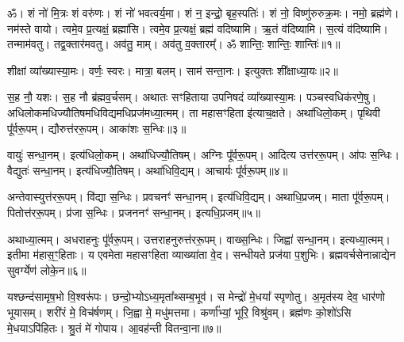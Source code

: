 \setcounter{anuvakam}{0}
\label{sec:start_taittiriyopanishat}

ॐ। शं नो॑ मि॒त्रः शं वरु॑णः। 
शं नो॑ भवत्वर्य॒मा। 
शं न॒ इन्द्रो॒ बृह॒स्पतिः॑। 
शं नो॒ विष्णु॑रुरुक्र॒मः। 
नमो॒ ब्रह्म॑णे। 
नम॑स्ते वायो। 
त्वमे॒व प्र॒त्यक्षं॒ ब्रह्मा॑सि। 
त्वमे॒व प्र॒त्यक्षं॒ ब्रह्म॑ वदिष्यामि। 
ऋ॒तं व॑दिष्यामि। 
स॒त्यं व॑दिष्यामि। 
तन्माम॑वतु। 
तद्व॒क्तार॑मवतु। 
अव॑तु॒ माम्। 
अव॑तु व॒क्तारम्᳚। 
ॐ शान्तिः॒ शान्तिः॒ शान्तिः॑॥१॥%
\anuvakamend[स॒त्यं व॑दिष्यामि॒ पञ्च॑ च]

शीक्षां व्या᳚ख्यास्या॒मः। 
वर्णः॒ स्वरः। 
मात्रा॒ बलम्। 
साम॑ सन्ता॒नः। 
इत्युक्तः शी᳚क्षाध्या॒यः॥२॥
\anuvakamend[शीक्षां पञ्च॑]

स॒ह नौ॒ यशः। 
स॒ह नौ ब्र॑ह्मव॒र्चसम्। 
अथातः सꣳहिताया उप\-निषदं व्या᳚ख्यास्या॒मः। 
पञ्चस्वधिक॑रणे॒षु। 
अधिलोकमधि\-ज्यौतिषमधि\-विद्यमधि\-प्रज॑मध्या॒त्मम्। 
ता महा\-सꣳहिता इ॑त्या\-च॒क्षते। 
अथा॑धिलो॒कम्। 
पृथिवी पू᳚र्व\-रू॒पम्। 
द्यौरुत्त॑र\-रू॒पम्। 
आका॑शः स॒न्धिः॥३॥

वायुः॑ सन्धा॒नम्। 
इत्य॑धि\-लो॒कम्। 
अथा॑धिज्यौ॒तिषम्। 
अग्निः पू᳚र्व\-रू॒पम्। 
आदित्य उत्त॑र\-रू॒पम्। 
आ॑पः स॒न्धिः। 
वैद्युतः॑ सन्धा॒नम्। 
इत्य॑धि\-ज्यौ॒तिषम्। 
अथा॑धिवि॒द्यम्। 
आचार्यः पू᳚र्वरू॒पम्॥४॥

अन्तेवास्युत्त॑र\-रू॒पम्। 
वि॑द्या स॒न्धिः। 
प्रवचनꣳ॑ सन्धा॒नम्। 
इत्य॑धि\-वि॒द्यम्। 
अथाधि॒प्रजम्। 
माता पू᳚र्व\-रू॒पम्। 
पितोत्त॑र\-रू॒पम्। 
प्र॑जा स॒न्धिः। 
प्रजननꣳ॑ सन्धा॒नम्। 
इत्यधि॒प्रजम्॥५॥

अथाध्या॒त्मम्। 
अधराहनुः पू᳚र्व\-रू॒पम्। 
उत्तराहनुरुत्त॑र\-रू॒पम्। 
वाख्स॒न्धिः। 
जिह्वा॑ सन्धा॒नम्। 
इत्यध्या॒त्मम्। 
इतीमा म॑हा\-स॒ꣳ॒हिताः। 
य एवमेता महा\-सꣳहिता व्याख्या॑ता वे॒द। 
सन्धीयते प्रज॑या प॒शुभिः। 
ब्रह्मवर्चसेनान्नाद्येन सुवर्ग्येण॑ लोके॒न॥६॥
\anuvakamend[स॒न्धिराचार्यः पू᳚र्वरू॒पमित्यधि॒प्रजं लो॑के॒न]

यश्छन्द॑सामृष॒भो वि॒श्वरू॑पः। 
छन्दो॒भ्योऽध्य॒मृता᳚थ्सम्ब॒भूव॑। 
स मेन्द्रो॑ मे॒धया᳚ स्पृणोतु। 
अ॒मृत॑स्य देव॒ धार॑णो भूयासम्। 
शरी॑रं मे॒ विच॑र्\mbox{}षणम्। 
जि॒ह्वा मे॒ मधु॑मत्तमा। 
कर्णा᳚भ्यां॒ भूरि॒ विश्रु॑वम्। 
ब्रह्म॑णः को॒शो॑ऽसि मे॒धयाऽपि॑हितः। 
श्रु॒तं मे॑ गोपाय। 
आ॒वह॑न्ती वितन्वा॒ना॥७॥

